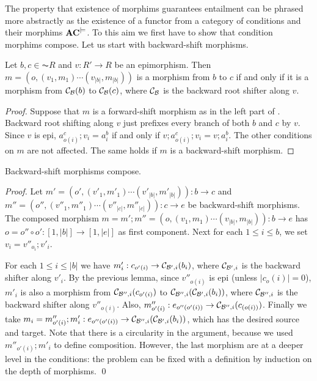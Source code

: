 The property that existence of morphims guarantees entailment can be phrased more abstractly as the existence of a functor from a category of conditions and their morphims $\mathbf{AC}^{\models}$. To this aim we first have to show that condition morphims compose. Let us start with backward-shift morphisms.

\begin{lemma}
Let $b,c \in  \AC{R}$ and $v: R' \to R$ be an epimorphism. Then $m = (o,(v_1,m_1)\cdots(v_{|b|},m_{|b|}))$ is a morphism from $b$ to $c$ if and only if it is a morphism from $\mathcal{C}_{\mathcal{B}}(b)$ to $\mathcal{C}_{\mathcal{B}}(c)$, where $\mathcal{C}_{\mathcal{B}}$ is the backward root shifter along $v$. 
\end{lemma}

\begin{proof}
  Suppose that $m$ is a forward-shift morphism as 
  in the left part of . Backward root shifting along $v$ just prefixes every branch of both $b$ and $c$ by $v$. Since $v$ is epi, $a^c_{o(i)} ; v_i = a^b_i$ if and only if $v; a^c_{o(i)} ; v_i = v; a^b_i$. The other conditions on $m$ are not affected.  The same holds if $m$ is a backward-shift morphism.
\end{proof}
  
\begin{lemma}
  Backward-shift morphisms compose.
\end{lemma}
\begin{proof}
Let $m' = (o',(v'_1,m'_1)\cdots(v'_{|b|},m'_{|b|})): b \to c$ and 
$m'' = (o'',(v''_1,m''_1)\cdots(v''_{|c|},m''_{|c|})): c \to e$ be backward-shift morphisms.  The composed morphism $m = m' ; m'' = (o,(v_1,m_1)\cdots(v_{|b|},m_{|b|})): b \to e$ has $o = o'' \circ o': [1,|b|] \to [1,|e|]$ as first component. Next for each $1\leq i \leq b$, we set $v_i = v''_{o_i} ; v'_i$.  

For each $1\leq i \leq |b|$ we have $m'_i: c_{o'(i)} \to \mathcal{C}_{\mathcal{B}',i}(b_i)$, where $\mathcal{C}_{\mathcal{B}',i}$ is the backward shifter along $v'_i$. 
By the previous lemma, since $v''_{o(i)}$ is epi (unless $|c_o(i)| = 0$),  $m'_i$ is also a morphism from $\mathcal{C}_{\mathcal{B}'',i}(c_{o'(i)})$  to $\mathcal{C}_{\mathcal{B}'',i}(\mathcal{C}_{\mathcal{B}',i}(b_i))$, where $\mathcal{C}_{\mathcal{B}'',i}$ is the backward shifter along $v''_{o(i)}$. Also, $m''_{o'(i)}: e_{o''(o'(i))} \to \mathcal{C}_{\mathcal{B}'',i}(c_{(o(i))})$. Finally we take $m_i = m''_{o'(i)}; m'_i : e_{o''(o'(i))} \to \mathcal{C}_{\mathcal{B}'',i}(\mathcal{C}_{\mathcal{B}',i}(b_i))$, which has the desired source and target. Note that there is a circularity in the argument, because we used $m''_{o'(i)}; m'_i$ to define composition. However, the last morphism are at a deeper level in the conditions: the problem can be fixed with a definition by induction on the depth of morphisms.  \qed
\end{proof}

